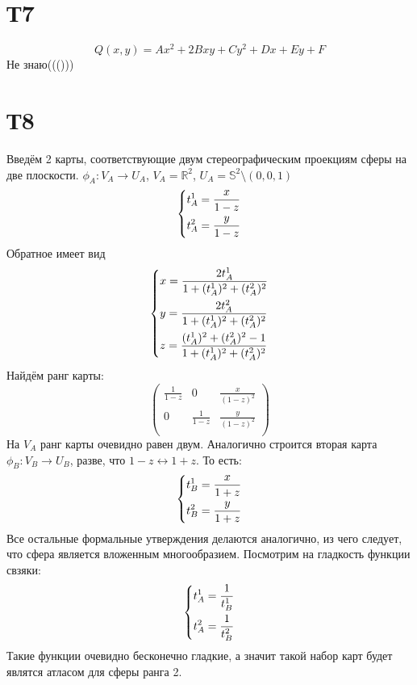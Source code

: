 \documentclass[12pt]{article}
\begin{document}
\section{Т7}
\[
    Q(x, y) = Ax^2 + 2Bxy + Cy^2 + Dx + Ey + F
\]
Не знаю((()))

\section{Т8}
Введём 2 карты, соответствующие двум стереографическим проекциям сферы на две плоскости. 
$\phi_A: V_A \to U_A$, $V_A = \mathbb{R}^2$, $U_A = \mathbb{S}^2 \setminus (0, 0, 1)$   
\[
    \begin{dcases}
        t_A^1 = \frac{x}{1 - z} \\
        t_A^2 = \frac{y}{1 - z}
    \end{dcases}
\]
Обратное имеет вид 
\[
    \begin{dcases}
        x = \frac{2t_A^1}{1 + (t_A^1)^2 + (t_A^2)^2} \\ 
        y = \frac{2t_A^2}{1 + (t_A^1)^2 + (t_A^2)^2} \\ 
        z = \frac{(t_A^1)^2 + (t_A^2)^2 - 1}{1 + (t_A^1)^2 + (t_A^2)^2}
    \end{dcases}
\]
Найдём ранг карты: 
\[
    \begin{pmatrix}
        \frac{1}{1 - z} & 0 & \frac{x}{(1-z)^2} \\ 
        0 & \frac{1}{1 - z} & \frac{y}{(1-z)^2} \\ 
    \end{pmatrix}
\]
На $V_A$ ранг карты очевидно равен двум.
Аналогично строится вторая карта $\phi_B: V_B \to U_B$, разве, что $1 - z \leftrightarrow 1 + z$. То есть: 
\[
    \begin{dcases}
        t_B^1 = \frac{x}{1 + z} \\
        t_B^2 = \frac{y}{1 + z}
    \end{dcases}
\]
Все остальные формальные утверждения делаются аналогично, из чего следует, что сфера 
является вложенным многообразием. 
Посмотрим на гладкость функции свзяки: 
\[
    \begin{dcases}
        t_A^1 = \frac{1}{t_B^1} \\
        t_A^2 = \frac{1}{t_B^2}
    \end{dcases}
\]
Такие функции очевидно бесконечно гладкие, а значит такой набор карт будет являтся 
атласом для сферы ранга 2.
\end{document}

